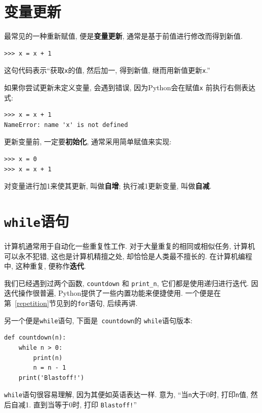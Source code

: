 \documentclass[10pt]{book}
\begin{document}
\section{变量更新}
\label{update}


最常见的一种重新赋值, 便是{\bf 变量更新},
通常是基于前值进行修改而得到新值. 

\begin{verbatim}
>>> x = x + 1
\end{verbatim}
%
这句代码表示``获取{\tt x}的值, 然后加一, 得到新值, 继而用新值更新{\tt x}.'' 

如果你尝试更新未定义变量, 会遇到错误, 
因为Python会在赋值{\tt x} 前执行右侧表达式:

\begin{verbatim}
>>> x = x + 1
NameError: name 'x' is not defined
\end{verbatim}
%
更新变量前, 一定要{\bf 初始化}, 通常采用简单赋值来实现:

\begin{verbatim}
>>> x = 0
>>> x = x + 1
\end{verbatim}
%
对变量进行加1来使其更新, 叫做{\bf 自增};
执行减1更新变量, 叫做{\bf 自减}. 


\section{{\tt while}语句}
计算机通常用于自动化一些重复性工作. 
对于大量重复的相同或相似任务, 计算机可以永不犯错, 
这也是计算机精擅之处, 却恰恰是人类最不擅长的. 
在计算机编程中, 这种重复, 便称作{\bf 迭代}.

我们已经遇到过两个函数,  {\tt countdown} 和
\verb"print_n",  它们都是使用递归进行迭代. 
因迭代操作很普遍, Python提供了一些内置功能来便捷使用. 
一个便是在第~\ref{repetition}节见到的{\tt for}语句, 后续再讲. 

另一个便是{\tt while}语句, 下面是{\tt
countdown}的 {\tt while}语句版本:

\begin{verbatim}
def countdown(n):
    while n > 0:
        print(n)
        n = n - 1
    print('Blastoff!')
\end{verbatim}
%
{\tt while}语句很容易理解, 因为其便如英语表达一样. 
意为, ``当{\tt n}大于0时, 打印{\tt n}值, 然后自减1.
直到当等于0时, 打印 {\tt Blastoff!}''
\end{document}
